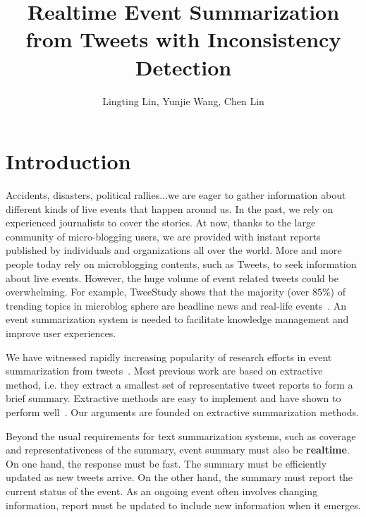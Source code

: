 \documentclass{llncs}
\begin{document}
\title{Realtime Event Summarization from Tweets with Inconsistency Detection}
\author{Lingting Lin, Yunjie Wang, Chen Lin}

\maketitle
\begin{abstract}
\end{abstract}
\section{Introduction}
Accidents, disasters, political rallies...we are eager to gather information about different kinds of live events that happen around us. In the past, we rely on experienced journalists to cover the stories. At now, thanks to the large community of micro-blogging users, we are provided with instant reports published by individuals and organizations all over the world.  More and more people today rely on microblogging contents, such as Tweets, to seek information about live events. However, the huge volume of event related tweets could be overwhelming. For example, TweeStudy shows that the majority (over $85\%$) of trending topics in microblog sphere are headline news and real-life events~\cite{kwak2010twitter}. An event summarization system is needed to facilitate knowledge management and improve user experiences.

We have witnessed rapidly increasing popularity of research efforts in event summarization from tweets~\cite{}.   Most previous work are based on extractive method, i.e. they extract a smallest set of representative tweet reports to form a brief summary. Extractive methods are easy to implement and have shown to perform well~\cite{}. Our arguments are founded on extractive summarization methods.

Beyond the usual requirements for text summarization systems, such as coverage and representativeness of the summary,  event summary must also be \textbf{realtime}. On one hand, the response must be fast. The summary must be efficiently updated as new tweets arrive. On the other hand, the summary must report the current status of the event. As an ongoing event often involves changing information, report must be updated to include new information when it emerges.
\end{document}
